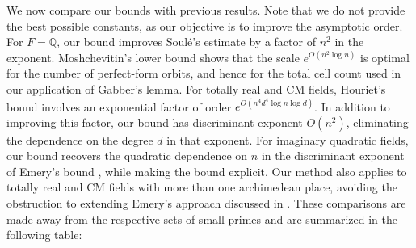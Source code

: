 \documentclass[11pt,a4paper,twoside]{amsart}
\theoremstyle{plain}
\theoremstyle{definition}
\begin{document}
We now compare our bounds with previous results. Note that we  do not provide the best possible constants, as our objective is to improve the asymptotic order. For $F=\mathbb Q$, our bound improves Soul\'e's estimate by a factor of $n^2$ in the exponent. Moshchevitin's lower bound \cite{moshchevitin2026} shows that the scale $e^{O(n^2\log n)}$ is optimal for the number of perfect-form orbits, and hence for the total cell count used in our application of Gabber's lemma. For totally real and CM fields, Houriet's bound \cite[Theorem~4.3]{Juliet_PHD} involves an exponential factor of order $e^{O(n^4d^4\log n\log d)}$. In addition to improving this factor, our bound has discriminant exponent $O(n^2)$, eliminating the dependence on the degree $d$ in that exponent. For imaginary quadratic fields, our bound recovers the quadratic
dependence on $n$ in the discriminant exponent of Emery's bound
\cite[Proposition~4.1]{Emery_imaginary_quad}, while making the
bound explicit. Our method also applies to totally real and CM
fields with more than one archimedean place, avoiding the
obstruction to extending Emery's approach discussed in
\cite[Remark~4.3]{Emery_imaginary_quad}.
These comparisons are made away from the respective sets of
small primes and are summarized in the following table:
\end{document}
